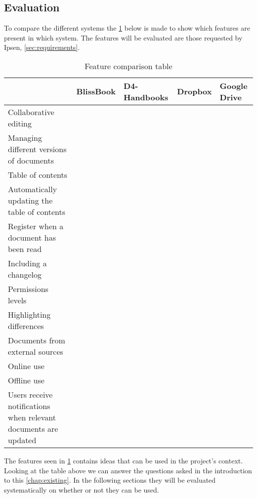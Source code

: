 \subsection{Evaluation}
To compare the different systems the \cref{tab:Exsisting} below is made to show which features are present in which system.
The features will be evaluated are those requested by Ipsen, \cref{sec:requirements}.

\begin{table}[H]
	\begin{center}
		\begin{tabular}{| m{5cm}|m{1.6cm}|m{2cm}|m{1.5cm}|m{1.2cm}|}
			\hline
			& BlissBook  & D4-Handbooks & Dropbox & Google \newline Drive \\
			\hline
			Collaborative editing & \checkmark & & & \checkmark \\
			\hline
			Managing different versions of documents & \checkmark &  &  & \checkmark \\
			\hline
			Table of contents & \checkmark & \checkmark  & & \\
			\hline
			Automatically updating the table of contents & \checkmark & \checkmark  &  & \\
			\hline
			Register when a document has been read & \checkmark & \checkmark &  & \\
			\hline
			Including a changelog & \checkmark & \checkmark  &  & \\
			\hline
			Permissions levels & \checkmark &  & \checkmark & \checkmark \\
			\hline
			Highlighting differences & \checkmark &  &  & \checkmark\\
			\hline
			Documents from external \newline sources &  &  & \checkmark & \checkmark \\
			\hline
			Online use & \checkmark &  \checkmark & \checkmark  & \checkmark \\
			\hline
			Offline use & & \checkmark & \checkmark & \checkmark \\
			\hline
			Users receive notifications when relevant documents are updated & & \checkmark & & \\
			\hline
		\end{tabular}
		\caption{Feature comparison table}\label{tab:Exsisting}
	\end{center}
\end{table}

The features seen in \cref{tab:Exsisting} contains ideas that can be used in the project's context.
Looking at the table above we can answer the questions asked in the introduction to this \cref{chap:existing}.
In the following sections they will be evaluated systematically on whether or not they can be used.

